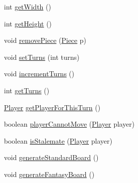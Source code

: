 \begin{DoxyCompactItemize}
int \hyperlink{classchessboard_1_1_chess_board_a8dfab964b5ad169064a62363bc7d0b04}{get\+Width} ()
\item 
int \hyperlink{classchessboard_1_1_chess_board_a2357c65378bac8ae24846f4d122bd3eb}{get\+Height} ()
\item 
void \hyperlink{classchessboard_1_1_chess_board_a657610e54b48f68c96c52af0170e0d82}{remove\+Piece} (\hyperlink{classpiece_1_1_piece}{Piece} p)
\item 
void \hyperlink{classchessboard_1_1_chess_board_a7f80c079e2bbd4e538ceb3b3ad0be81f}{set\+Turns} (int turns)
\item 
void \hyperlink{classchessboard_1_1_chess_board_a25e5bfbfe9f7bb1ccecd2e6b6b7c535d}{increment\+Turns} ()
\item 
int \hyperlink{classchessboard_1_1_chess_board_a535dad0864d10c1a2f11bcb1cec2e1ec}{get\+Turns} ()
\item 
\hyperlink{enumchessboard_1_1_player}{Player} \hyperlink{classchessboard_1_1_chess_board_a9eaa26069854d00d362071ed7dfe6ff1}{get\+Player\+For\+This\+Turn} ()
\item 
boolean \hyperlink{classchessboard_1_1_chess_board_add7b556d1e52a4ec70c2dc9154c587a2}{player\+Cannot\+Move} (\hyperlink{enumchessboard_1_1_player}{Player} player)
\item 
boolean \hyperlink{classchessboard_1_1_chess_board_a54ce6f2b74db08e4ed2e11982ca396c7}{is\+Stalemate} (\hyperlink{enumchessboard_1_1_player}{Player} player)
\item 
void \hyperlink{classchessboard_1_1_chess_board_a7f81546419328da5580d87e24bfed804}{generate\+Standard\+Board} ()
\item 
void \hyperlink{classchessboard_1_1_chess_board_a70b0f46299f574a5ef465105fefcfb08}{generate\+Fantasy\+Board} ()
\end{DoxyCompactItemize}
